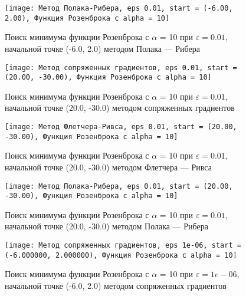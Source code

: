             \begin{figure}[H]
	        \centering
	        \texttt{[image: Метод Полака-Рибера, eps 0.01, start = (-6.00, 2.00), Функция Розенброка с alpha = 10]}%
	        \caption{Поиск минимума функции Розенброка с $\alpha$ = 10 при $\varepsilon = 0.01$, начальной точке (-6.0, 2.0) методом Полака --- Рибера}
	        \vspace*{-1.2cm}
            \end{figure}
            
            \begin{figure}[H]
	        \centering
	        \texttt{[image: Метод сопряженных градиентов, eps 0.01, start = (20.00, -30.00), Функция Розенброка с alpha = 10]}%
	        \caption{Поиск минимума функции Розенброка с $\alpha$ = 10 при $\varepsilon = 0.01$, начальной точке (20.0, -30.0) методом сопряженных градиентов}
	        \vspace*{-1.2cm}
            \end{figure}
            
            \begin{figure}[H]
	        \centering
	        \texttt{[image: Метод Флетчера-Ривса, eps 0.01, start = (20.00, -30.00), Функция Розенброка с alpha = 10]}%
	        \caption{Поиск минимума функции Розенброка с $\alpha$ = 10 при $\varepsilon = 0.01$, начальной точке (20.0, -30.0) методом Флетчера --- Ривса}
	        \vspace*{-1.2cm}
            \end{figure}
            
            \begin{figure}[H]
	        \centering
	        \texttt{[image: Метод Полака-Рибера, eps 0.01, start = (20.00, -30.00), Функция Розенброка с alpha = 10]}%
	        \caption{Поиск минимума функции Розенброка с $\alpha$ = 10 при $\varepsilon = 0.01$, начальной точке (20.0, -30.0) методом Полака --- Рибера}
	        \vspace*{-1.2cm}
            \end{figure}
            
            \begin{figure}[H]
	        \centering
	        \texttt{[image: Метод сопряженных градиентов, eps 1e-06, start = (-6.000000, 2.000000), Функция Розенброка с alpha = 10]}%
	        \caption{Поиск минимума функции Розенброка с $\alpha$ = 10 при $\varepsilon = 1e-06$, начальной точке (-6.0, 2.0) методом сопряженных градиентов}
	        \vspace*{-1.2cm}
            \end{figure}
            
